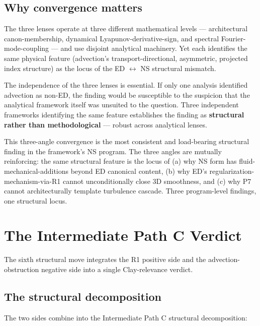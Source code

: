 \documentclass[11pt,a4paper]{article}
\begin{document}
\subsection{Why convergence matters}

The three lenses operate at three different mathematical levels --- architectural canon-membership, dynamical Lyapunov-derivative-sign, and spectral Fourier-mode-coupling --- and use disjoint analytical machinery. Yet each identifies the same physical feature (advection's transport-directional, asymmetric, projected index structure) as the locus of the ED $\leftrightarrow$ NS structural mismatch.

The independence of the three lenses is essential. If only one analysis identified advection as non-ED, the finding would be susceptible to the suspicion that the analytical framework itself was unsuited to the question. Three independent frameworks identifying the same feature establishes the finding as \textbf{structural rather than methodological} --- robust across analytical lenses.

This three-angle convergence is the most consistent and load-bearing structural finding in the framework's NS program. The three angles are mutually reinforcing: the same structural feature is the locus of (a) why NS form has fluid-mechanical-additions beyond ED canonical content, (b) why ED's regularization-mechanism-via-R1 cannot unconditionally close 3D smoothness, and (c) why P7 cannot architecturally template turbulence cascade. Three program-level findings, one structural locus.

\section{The Intermediate Path C Verdict}

The sixth structural move integrates the R1 positive side and the advection-obstruction negative side into a single Clay-relevance verdict.

\subsection{The structural decomposition}

The two sides combine into the Intermediate Path C structural decomposition:
\end{document}

